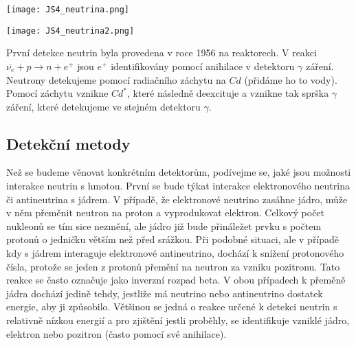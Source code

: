 \documentclass[../../main.tex]{subfiles}
\begin{document}
\begin{center}
	\texttt{[image: JS4\_neutrina.png]}
\end{center}

\begin{center}
	\texttt{[image: JS4\_neutrina2.png]}
\end{center}

První detekce neutrin byla provedena v roce 1956 na reaktorech. V reakci $\overline{\nu _e} + p \rightarrow n + e^+$ jsou $e^+$ identifikovány pomocí anihilace v detektoru $\gamma$ záření. Neutrony detekujeme pomocí radiačního záchytu na $Cd$ (přidáme ho to vody). Pomocí záchytu vznikne $Cd^*$, které následně deexcituje a vznikne tak sprška $\gamma$ záření, které detekujeme ve stejném detektoru $\gamma$. 

\subsection{Detekční metody}

Než se budeme věnovat konkrétním detektorům, podívejme se, jaké jsou možnosti interakce neutrin s hmotou. První se bude týkat interakce elektronového neutrina či antineutrina s jádrem. V případě, že elektronové neutrino zasáhne jádro, může v něm přeměnit neutron na proton a vyprodukovat elektron. Celkový počet nukleonů se tím sice nezmění, ale jádro již bude přináležet prvku s počtem protonů o jedničku větším než před srážkou. Při podobné situaci, ale v případě kdy s jádrem interaguje elektronové antineutrino, dochází k snížení protonového čísla, protože se jeden z protonů přemění na neutron za vzniku pozitronu. Tato reakce se často označuje jako inverzní rozpad beta. V obou případech k přeměně jádra dochází jedině tehdy, jestliže má neutrino nebo antineutrino dostatek energie, aby ji způsobilo. Většinou se jedná o reakce určené k detekci neutrin s relativně nízkou energií a pro zjištění jestli proběhly, se identifikuje vzniklé jádro, elektron nebo pozitron (často pomocí své anihilace).
\end{document}
